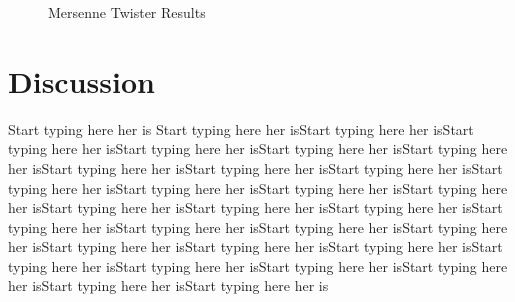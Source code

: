 \documentclass[conference]{IEEEtran}
\begin{document}
\begin{figure}[H]
\centering
{}
\qquad
{}
\caption{Mersenne Twister Results}
\label{fig:globfig}
\end{figure}

\section{Discussion}
Start typing here her is Start typing here her isStart typing here her isStart typing here her isStart typing here her isStart typing here her isStart typing here her isStart typing here her isStart typing here her isStart typing here her isStart typing here her isStart typing here her isStart typing here her isStart typing here her isStart typing here her isStart typing here her isStart typing here her isStart typing here her isStart typing here her isStart typing here her isStart typing here her isStart typing here her isStart typing here her isStart typing here her isStart typing here her isStart typing here her isStart typing here her isStart typing here her isStart typing here her isStart typing here her is
\end{document}
